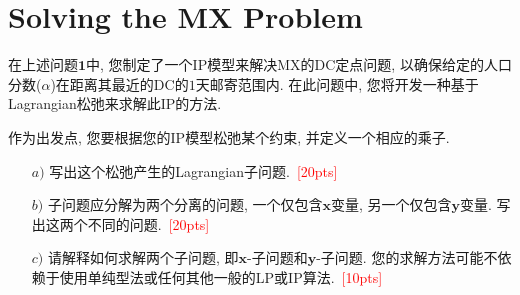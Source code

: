 \documentclass[10pt]{article}
\begin{document}
\section{\textbf{Solving the MX Problem}}
在上述问题$\bm{1}$中, 您制定了一个IP模型来解决MX的DC定点问题, 以确保给定的人口分数($\alpha$)在距离其最近的DC的$1$天邮寄范围内. 在此问题中, 您将开发一种基于Lagrangian松弛来求解此IP的方法.

作为出发点, 您要根据您的IP模型松弛某个约束, 并定义一个相应的乘子.
\begin{itemize}
	\item[$a)$] 写出这个松弛产生的Lagrangian子问题.~\textcolor{red}{[20pts]}
	
	\item[$b)$] 子问题应分解为两个分离的问题, 一个仅包含$\bm{x}$变量, 另一个仅包含$\bm{y}$变量. 写出这两个不同的问题.~\textcolor{red}{[20pts]}
	
	\item[$c)$] 请解释如何求解两个子问题, 即$\bm{x}$-子问题和$\bm{y}$-子问题. 您的求解方法可能不依赖于使用单纯型法或任何其他一般的LP或IP算法.~\textcolor{red}{[10pts]}
\end{itemize}
\end{document}

